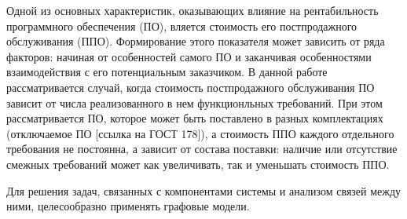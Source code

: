 Одной из основных характеристик, оказывающих влияние на рентабильность программного обеспечения (ПО), вляется стоимость его постпродажного обслуживания (ППО). Формирование этого показателя может зависить от ряда факторов: начиная от особенностей самого ПО и заканчивая особенностями взаимодействия с его потенциальным заказчиком. В данной работе рассматривается случай, когда стоимость постпродажного обслуживания ПО зависит от числа реализованного в нем функционльных требований. При этом рассматривается ПО, которое может быть поставлено в разных комплектациях (отключаемое ПО [ссылка на ГОСТ 178]), а стоимость ППО каждого отдельного требования не постоянна, а зависит от состава поставки: наличие или отсутствие смежных требований может как увеличивать, так и уменьшать стоимость ППО.

Для решения задач, связанных с компонентами системы и анализом связей между ними, целесообразно применять графовые модели. 







